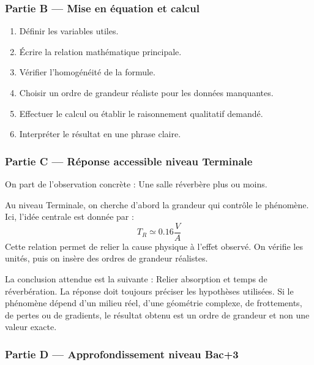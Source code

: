 \documentclass[11pt,a4paper]{article}
\begin{document}
\subsubsection*{Partie B — Mise en équation et calcul}

\begin{enumerate}
  \item Définir les variables utiles.
  \item Écrire la relation mathématique principale.
  \item Vérifier l'homogénéité de la formule.
  \item Choisir un ordre de grandeur réaliste pour les données manquantes.
  \item Effectuer le calcul ou établir le raisonnement qualitatif demandé.
  \item Interpréter le résultat en une phrase claire.
\end{enumerate}

\subsubsection*{Partie C — Réponse accessible niveau Terminale}

\begin{corrigebox}
On part de l'observation concrète : Une salle réverbère plus ou moins.

Au niveau Terminale, on cherche d'abord la grandeur qui contrôle le phénomène. Ici, l'idée centrale est donnée par :
\[
T_R\simeq0.16\frac{V}{A}
\]
Cette relation permet de relier la cause physique à l'effet observé. On vérifie les unités, puis on insère des ordres de grandeur réalistes.

La conclusion attendue est la suivante : Relier absorption et temps de réverbération. La réponse doit toujours préciser les hypothèses utilisées. Si le phénomène dépend d'un milieu réel, d'une géométrie complexe, de frottements, de pertes ou de gradients, le résultat obtenu est un ordre de grandeur et non une valeur exacte.
\end{corrigebox}

\subsubsection*{Partie D — Approfondissement niveau Bac+3}
\end{document}
